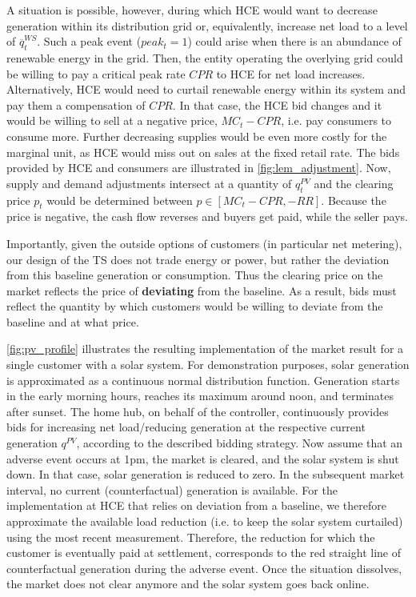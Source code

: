 A situation is possible, however, during which HCE would want to decrease generation within its distribution grid or, equivalently, increase net load to a level of $\overline{q}^{WS}_t$. Such a peak event ($peak_t = 1$) could arise when there is an abundance of renewable energy in the grid. Then, the entity operating the overlying grid could be willing to pay a critical peak rate $CPR$ to HCE for net load increases. Alternatively, HCE would need to curtail renewable energy within its system and pay them a compensation of $CPR$. In that case, the HCE bid changes and it would be willing to sell at a negative price, $MC_t - CPR$, i.e. pay consumers to consume more. Further decreasing supplies would be even more costly for the marginal unit, as HCE would miss out on sales at the fixed retail rate. 
The bids provided by HCE and consumers are illustrated in \cref{fig:lem_adjustment}. Now, supply and demand adjustments intersect at a quantity of $q^{PV}_t$ and the clearing price $p_t$ would be determined between $p \in [MC_t - CPR, -RR]$. Because the price is negative, the cash flow reverses and buyers get paid, while the seller pays.

Importantly, given the outside options of customers (in particular net metering), our design of the TS does not trade energy or power, but rather the deviation from this baseline generation or consumption. Thus the clearing price on the market reflects the price of \textbf{deviating} from the baseline. As a result, bids must reflect the quantity by which customers would be willing to deviate from the baseline and at what price. 

\cref{fig:pv_profile} illustrates the resulting implementation of the market result for a single customer with a solar system. For demonstration purposes, solar generation is approximated as a continuous normal distribution function. Generation starts in the early morning hours, reaches its maximum around noon, and terminates after sunset. The home hub, on behalf of the controller, continuously provides bids for increasing net load/reducing generation at the respective current generation $q^{PV}$, according to the described bidding strategy. Now assume that an adverse event occurs at 1pm, the market is cleared, and the solar system is shut down. In that case, solar generation is reduced to zero. In the subsequent market interval, no current (counterfactual) generation is available. For the implementation at HCE that relies on deviation from a baseline, we therefore approximate the available load reduction (i.e. to keep the solar system curtailed) using the most recent measurement. Therefore, the reduction for which the customer is eventually paid at settlement, corresponds to the red straight line of counterfactual generation during the adverse event. Once the situation dissolves, the market does not clear anymore and the solar system goes back online.

